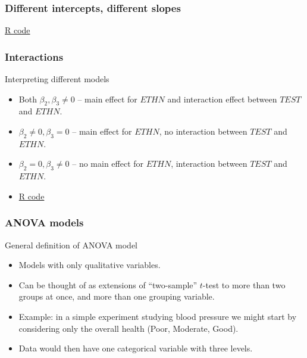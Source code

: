 \documentclass[handout]{beamer}
\begin{document}
   \begin{frame}
   \frametitle{Different intercepts, different slopes}
   \begin{center}
   \end{center}
   \href{http://stats191.stanford.edu/interactions.html#minority-employment-data}{R code}
   \end{frame}


   \begin{frame} \frametitle{Interactions}

   \begin{block}
   {Interpreting different models                     }
   \begin{itemize}[<+->]

   \item Both  $\beta_2, \beta_3 \neq 0$ -- main effect for $ETHN$ and interaction effect
   between $TEST$ and $ETHN$.
   \item $\beta_2 \neq 0, \beta_3 = 0$ -- main effect for $ETHN$, no interaction between $TEST$ and $ETHN$.
   \item $\beta_2=0, \beta_3 \neq 0$ -- no main effect for $ETHN$,  interaction between $TEST$ and $ETHN$.


   \item \href{http://stats191.stanford.edu/interactions.html#salary-example}{R code}
   \end{itemize}

   \end{block}
   \end{frame}


   \begin{frame} \frametitle{ANOVA models}

   \begin{block}
   {General definition of ANOVA model}
   \begin{itemize}

   \item Models with only qualitative variables.



   \item Can be thought of as extensions of ``two-sample'' $t$-test to more than two groups at once, and more than one grouping variable.

   \item Example: in a simple experiment studying blood pressure we might start by considering only the overall health (Poor, Moderate, Good).

   \item Data would then have one categorical variable with three levels.
   \end{itemize}
   \end{block}
   \end{frame}
\end{document}
